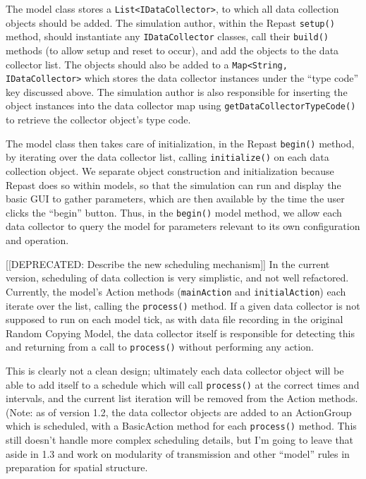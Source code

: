 \documentclass{kluwer-mem-copyright}
\begin{document}
\begin{article}
The model class stores a 
\texttt{List<IDataCollector>}, to which all data collection objects should be
added.  The simulation author, within the Repast \texttt{setup()} method, 
should instantiate any \texttt{IDataCollector} classes, call
their \texttt{build()} methods (to allow setup and reset to occur), and add the
objects to the data collector list.  The objects should also be added to a
\texttt{Map<String, IDataCollector>} which stores the data collector instances
under the ``type code'' key discussed above.  The simulation author is also
responsible for inserting the object instances into the data collector map using
\texttt{getDataCollectorTypeCode()} to retrieve the collector object's type code. 

The model class then takes care of initialization, in the Repast
 \texttt{begin()} method, by iterating over the data collector list, calling
\texttt{initialize()} on each data collection object.  We separate object
construction and initialization because Repast does so within models, so that
the simulation can run and display the basic GUI to gather parameters,
which are then available by the time the user clicks the ``begin'' button. 
Thus, in the \texttt{begin()} model method, we allow each data collector to
query the model for parameters relevant to its own configuration and operation.

[[DEPRECATED:  Describe the new scheduling mechanism]]
In the current version, scheduling of data collection is very simplistic, and
not well refactored.  Currently, the model's Action methods (\texttt{mainAction}
and \texttt{initialAction}) each iterate over the list, calling the
\texttt{process()} method.  If a given data collector is not supposed to run on
each model tick, as with data file recording in the original Random Copying
Model, the data collector itself is responsible for detecting this and returning
from a call to \texttt{process()} without performing any action.  

This is clearly not a clean design; ultimately each data collector object will
be able to add itself to a schedule which will call \texttt{process()} at the
correct times and intervals, and the current list iteration will be removed from
the Action methods. (Note:  as of version 1.2, the data collector objects are
added to an ActionGroup which is scheduled, with a BasicAction method for each
\texttt{process()} method.  This still doesn't handle more complex scheduling
details, but I'm going to leave that aside in 1.3 and work on modularity of 
transmission and other ``model'' rules in preparation for spatial structure.  


\end{article}
\end{document}
